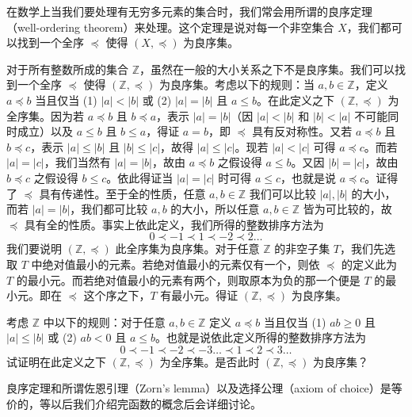 在数学上当我们要处理有无穷多元素的集合时，我们常会用所谓的良序定理（well-ordering theorem）来处理。这个定理是说对每一个非空集合 $X$，我们都可以找到一个全序 $\preceq$ 使得 $(X, \preceq)$ 为良序集。

\begin{example}
对于所有整数所成的集合 $\mathbb{Z}$，虽然在一般的大小关系之下不是良序集。我们可以找到一个全序 $\preceq$ 使得 $(\mathbb{Z}, \preceq)$ 为良序集。考虑以下的规则：当 $a, b \in \mathbb{Z}$，定义 $a \preceq b$ 当且仅当 (1) $|a| < |b|$ 或 (2) $|a| = |b|$ 且 $a \leq b$。在此定义之下 $(\mathbb{Z}, \preceq)$ 为全序集。因为若 $a \preceq b$ 且 $b \preceq a$，表示 $|a| = |b|$（因 $|a| < |b|$ 和 $|b| < |a|$ 不可能同时成立）以及 $a \leq b$ 且 $b \leq a$，得证 $a = b$，即 $\preceq$ 具有反对称性。又若 $a \preceq b$ 且 $b \preceq c$，表示 $|a| \leq |b|$ 且 $|b| \leq |c|$，故得 $|a| \leq |c|$。现若 $|a| < |c|$ 可得 $a \preceq c$。而若 $|a| = |c|$，我们当然有 $|a| = |b|$，故由 $a \preceq b$ 之假设得 $a \leq b$。又因 $|b| = |c|$，故由 $b \preceq c$ 之假设得 $b \leq c$。依此得证当 $|a| = |c|$ 时可得 $a \leq c$，也就是说 $a \preceq c$。证得了 $\preceq$ 具有传递性。至于全的性质，任意 $a, b \in \mathbb{Z}$ 我们可以比较 $|a|, |b|$ 的大小，而若 $|a| = |b|$，我们都可比较 $a, b$ 的大小，所以任意 $a, b \in \mathbb{Z}$ 皆为可比较的，故 $\preceq$ 具有全的性质。事实上依此定义，我们所得的整数排序方法为
$$ 0 \prec -1 \prec 1 \prec -2 \prec 2 \dots $$
我们要说明 $(\mathbb{Z}, \preceq)$ 此全序集为良序集。对于任意 $\mathbb{Z}$ 的非空子集 $T$，我们先选取 $T$ 中绝对值最小的元素。若绝对值最小的元素仅有一个，则依 $\preceq$ 的定义此为 $T$ 的最小元。而若绝对值最小的元素有两个，则取原本为负的那一个便是 $T$ 的最小元。即在 $\preceq$ 这个序之下，$T$ 有最小元。得证 $(\mathbb{Z}, \preceq)$ 为良序集。
\end{example}

\begin{question}
考虑 $\mathbb{Z}$ 中以下的规则：对于任意 $a, b \in \mathbb{Z}$ 定义 $a \preceq b$ 当且仅当 (1) $ab \geq 0$ 且 $|a| \leq |b|$ 或 (2) $ab < 0$ 且 $a \leq b$。也就是说依此定义所得的整数排序方法为
$$ 0 \prec -1 \prec -2 \prec -3 \dots \prec 1 \prec 2 \prec 3 \dots $$
试证明在此定义之下 $(\mathbb{Z}, \preceq)$ 为全序集。是否此时 $(\mathbb{Z}, \preceq)$ 为良序集？
\end{question}

良序定理和所谓佐恩引理（Zorn's lemma）以及选择公理（axiom of choice）是等价的，等以后我们介绍完函数的概念后会详细讨论。

